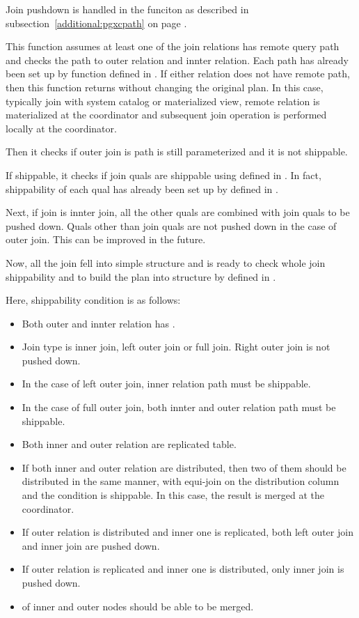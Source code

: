   Join pushdown is handled in the funciton  as described in
  subsection~\ref{additional:pgxcpath} on page \pageref{additional:pgxcpath}.
  
  This function assumes at least one of the join relations has remote query path
  and checks the path to outer relation and innter relation.
  Each path has already been set up by  function defined in
  .
  If either relation does not have remote path, then this function returns without changing
  the original plan.
  In this case, typically join with system catalog or materialized view, remote relation is
  materialized at the coordinator and subsequent join operation is performed locally at
  the coordinator.
  
  Then it checks if outer join is path is still parameterized and it is not shippable.
  
  If shippable, it checks if join quals are shippable using 
  defined in .
  In fact, shippability of each qual has already been set up by 
  defined in .
  
  Next, if join is innter join, all the other quals are combined with join quals to be pushed down.
  Quals other than join quals are not pushed down in the case of outer join.
  This can be improved in the future.
  
  Now, all the join fell into simple structure and is ready to check whole join shippability and
  to build the plan into  structure by  defined in
  .
  
  Here, shippability condition is as follows:
  
  \begin{itemize}
	  \item Both outer and innter relation has .
	  \item Join type is inner join, left outer join or full join.   Right outer join is not pushed down.
	  \item In the case of left outer join, inner relation path must be shippable.
	  \item In the case of full outer join, both innter and outer relation path must be shippable.
	  \item Both inner and outer relation are replicated table.
	  \item If both inner and outer relation are distributed, then two of them should be
	  		distributed in the same manner, with equi-join on the distribution column and
			the condition is shippable.
			In this case, the result is merged at the coordinator.
	  \item If outer relation is distributed and inner one is replicated, both left outer join and
	  		inner join are pushed down.
	  \item If outer relation is replicated and inner one is distributed, only inner join is pushed down.
	  \item {} of inner and outer nodes should be able to be merged.
  \end{itemize}
  
